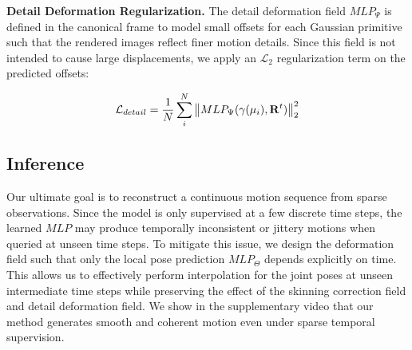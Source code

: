 \par 
\vspace{6pt}
\noindent\textbf{Detail Deformation Regularization.} The detail deformation field $MLP_\Psi$ is defined in the canonical frame to model small offsets for each Gaussian primitive such that the rendered images reflect finer motion details. Since this field is not intended to cause large displacements, we apply an $\mathcal{L}_2$ regularization term on the predicted offsets:

\begin{equation}
\mathcal{L}_{detail} = \frac{1}{N}\sum_i^N \left\| MLP_\Psi(\gamma(\mu_i), \mathbf{R}^t) \right\|^2_2
\end{equation}




\subsection{Inference}

Our ultimate goal is to reconstruct a continuous motion sequence from sparse observations. Since the model is only supervised at a few discrete time steps, the learned $MLP$ may produce temporally inconsistent or jittery motions when queried at unseen time steps. To mitigate this issue, we design the deformation field such that only the local pose prediction $MLP_\Theta$ depends explicitly on time. This allows us to effectively perform interpolation for the joint poses at unseen intermediate time steps while preserving the effect of the skinning correction field and detail deformation field. We show in the supplementary video that our method generates smooth and coherent motion even under sparse temporal supervision.


